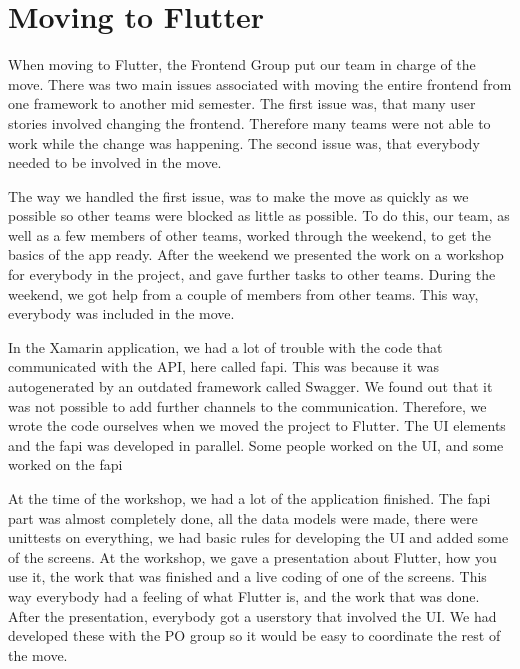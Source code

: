 \section{Moving to Flutter}
When moving to Flutter, the Frontend Group put our team in charge of the move. 
There was two main issues associated with moving the entire frontend from one framework to another mid semester.
The first issue was, that many user stories involved changing the frontend. Therefore many teams were not able to work while the change was happening.
The second issue was, that everybody needed to be involved in the move. 

The way we handled the first issue, was to make the move as quickly as we possible so other teams were blocked as little as possible.
To do this, our team, as well as a few members of other teams, worked through the weekend, to get the basics of the app ready. After the weekend we presented the work on a workshop for everybody in the project, and gave further tasks to other teams.
During the weekend, we got help from a couple of members from other teams. 
This way, everybody was included in the move. 

In the Xamarin application, we had a lot of trouble with the code that communicated with the API, here called \gls{fapi}. This was because it was autogenerated by an outdated framework called Swagger. We found out that it was not possible to add further channels to the communication. Therefore, we wrote the code ourselves when we moved the project to Flutter. The UI elements and the \gls{fapi} was developed in parallel. Some people worked on the UI, and some worked on the \gls{fapi}

At the time of the workshop, we had a lot of the application finished. The \gls{fapi} part was almost completely done, all the data models were made, there were unittests on everything, we had basic rules for developing the UI and added some of the screens. 
At the workshop, we gave a presentation about Flutter, how you use it, the work that was finished and a live coding of one of the screens. This way everybody had a feeling of what Flutter is, and the work that was done. 
After the presentation, everybody got a userstory that involved the UI. We had developed these with the \gls{PO} group so it would be easy to coordinate the rest of the move.  

